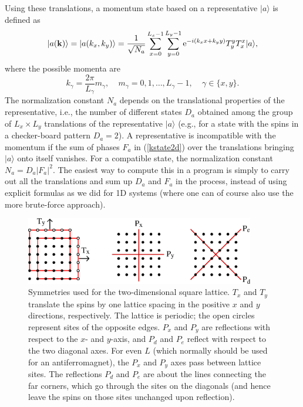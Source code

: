 \documentclass[draft,numberedheadings]{aipproc}
\begin{document}
Using these translations, a momentum state based on a representative $|a\rangle$ is defined as
\begin{equation}
|a({\bf k})\rangle = 
|a(k_x,k_y)\rangle = \frac{1}{\sqrt{N_a}}\sum_{x=0}^{L_x-1}\sum_{y=0}^{L_y-1}{\rm e}^{-i(k_xx+k_yy)}T_y^yT_x^x|a\rangle,
\label{kstate2d}
\end{equation}
where the possible momenta are 
\begin{equation}
k_{\gamma}=\frac{2\pi}{L_{\gamma}}m_{\gamma},~~~~~ m_{\gamma}=0,1,\ldots,L_{\gamma}-1,~~~~~\gamma \in \{x,y\}.
\end{equation}
The normalization constant $N_a$ depends on the translational properties of the representative, i.e., the number of different states $D_a$ obtained 
among the group of $L_x\times L_y$ translations of the representative $|a\rangle$ (e.g., for a state with the spins in a checker-board pattern $D_a=2$). 
A representative is incompatible with the momentum if the sum of phases $F_a$ in (\ref{kstate2d}) over the translations bringing $|a\rangle$ onto 
itself vanishes. For a compatible state, the normalization constant $N_a=D_a|F_a|^2$. The easiest way to compute this in a program is simply to carry 
out all the translations and sum up $D_a$ and $F_a$ in the process, instead of using explicit formulas as we did for 1D systems (where one can of course 
also use the more brute-force approach).

\begin{figure}
\includegraphics[width=10cm, clip]{squaretrans.eps}
\caption{Symmetries used for the two-dimensional square lattice. $T_x$ and $T_y$ translate the spins by one lattice spacing in the positive $x$ and 
$y$ directions, respectively. The lattice is periodic; the open circles represent sites of the opposite edges. $P_x$ and $P_y$ are reflections with respect 
to the $x$- and $y$-axis, and $P_d$ and $P_e$ reflect with respect to the two diagonal axes. For even $L$ (which normally should be used for an antiferromagnet), 
the $P_x$ and $P_y$ axes pass between lattice sites. The reflections $P_d$ and $P_e$ are about the lines connecting the far corners, which go through the 
sites on the diagonals (and hence leave the spins on those sites unchanged upon reflection).}
\label{squaretrans}
\end{figure}
\end{document}

